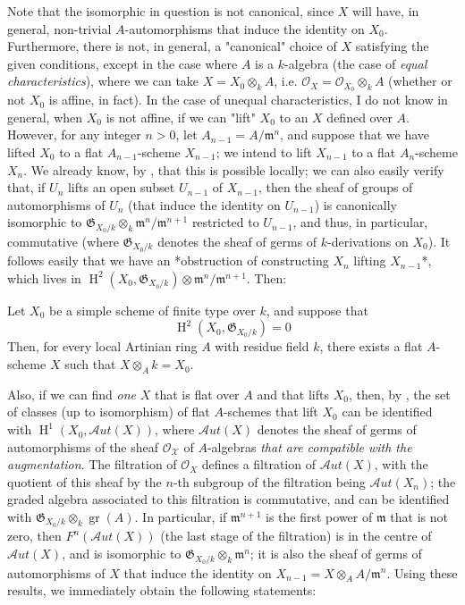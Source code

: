 Note that the isomorphic in question is not canonical, since $X$ will have, in general, non-trivial $A$-automorphisms that induce the identity on $X_0$.
Furthermore, there is not, in general, a "canonical" choice of $X$ satisfying the given conditions, except in the case where $A$ is a $k$-algebra (the case of \emph{equal characteristics}), where we can take $X=X_0\otimes_k A$, i.e. $\mathcal{O}_X=\mathcal{O}_{X_0}\otimes_k A$ (whether or not $X_0$ is affine, in fact).
In the case of unequal characteristics, I do not know in general, when $X_0$ is not affine, if we can "lift" $X_0$ to an $X$ defined over $A$.
However, for any integer $n>0$, let $A_{n-1}=A/\mathfrak{m}^n$, and suppose that we have lifted $X_0$ to a flat $A_{n-1}$-scheme $X_{n-1}$;
we intend to lift $X_{n-1}$ to a flat $A_n$-scheme $X_n$.
We already know, by , that this is possible locally;
we can also easily verify that, if $U_n$ lifts an open subset $U_{n-1}$ of $X_{n-1}$, then the sheaf of groups of automorphisms of $U_n$ (that induce the identity on $U_{n-1}$) is canonically isomorphic to $\mathfrak{G}_{X_0/k}\otimes_k\mathfrak{m}^n/\mathfrak{m}^{n+1}$ restricted to $U_{n-1}$, and thus, in particular, commutative (where $\mathfrak{G}_{X_0/k}$ denotes the sheaf of germs of $k$-derivations on $X_0$).
It follows easily that we have an *obstruction of constructing $X_n$ lifting $X_{n-1}$*, which lives in $\operatorname{H}^2(X_0,\mathfrak{G}_{X_0/k})\otimes\mathfrak{m}^n/\mathfrak{m}^{n+1}$.
Then:

\begin{corollary}\label{fga2-theorem-8-corollary-1}
    Let $X_0$ be a simple scheme of finite type over $k$, and suppose that
    \[\operatorname{H}^2(X_0,\mathfrak{G}_{X_0/k}) = 0\]
    Then, for every local Artinian ring $A$ with residue field $k$, there exists a flat $A$-scheme $X$ such that $X\otimes_A k=X_0$.
\end{corollary}

Also, if we can find \emph{one} $X$ that is flat over $A$ and that lifts $X_0$, then, by , the set of classes (up to isomorphism) of flat $A$-schemes that lift $X_0$ can be identified with $\operatorname{H}^1(X_0,\mathcal{A}ut(X))$, where $\mathcal{A}ut(X)$ denotes the sheaf of germs of automorphisms of the sheaf $\mathcal{O_X}$ of $A$-algebras \emph{that are compatible with the augmentation}.
The filtration of $\mathcal{O}_X$ defines a filtration of $\mathcal{A}ut(X)$, with the quotient of this sheaf by the $n$-th subgroup of the filtration being $\mathcal{A}ut(X_n)$;
the graded algebra associated to this filtration is commutative, and can be identified with $\mathfrak{G}_{X_0/k}\otimes_k\operatorname{gr}(A)$.
In particular, if $\mathfrak{m}^{n+1}$ is the first power of $\mathfrak{m}$ that is not zero, then $F^n(\mathcal{A}ut(X))$ (the last stage of the filtration) is in the centre of $\mathcal{A}ut(X)$, and is isomorphic to $\mathfrak{G}_{X_0/k}\otimes_k\mathfrak{m}^n$;
it is also the sheaf of germs of automorphisms of $X$ that induce the identity on $X_{n-1}=X\otimes_A A/\mathfrak{m}^n$.
Using these results, we immediately obtain the following statements:

